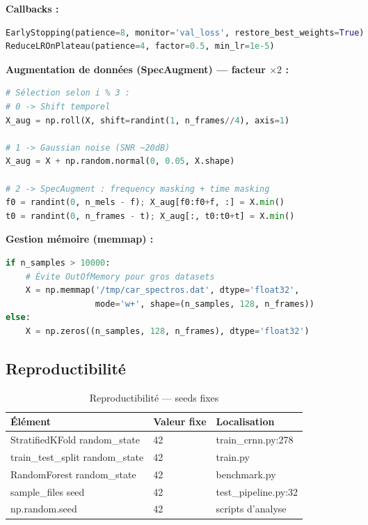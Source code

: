 \documentclass[11pt,a4paper]{article}
\begin{document}
\textbf{Callbacks :}
\begin{lstlisting}[language=Python]
EarlyStopping(patience=8, monitor='val_loss', restore_best_weights=True)
ReduceLROnPlateau(patience=4, factor=0.5, min_lr=1e-5)
\end{lstlisting}

\textbf{Augmentation de données (SpecAugment) — facteur $\times 2$ :}
\begin{lstlisting}[language=Python]
# Sélection selon i % 3 :
# 0 -> Shift temporel
X_aug = np.roll(X, shift=randint(1, n_frames//4), axis=1)

# 1 -> Gaussian noise (SNR ~20dB)
X_aug = X + np.random.normal(0, 0.05, X.shape)

# 2 -> SpecAugment : frequency masking + time masking
f0 = randint(0, n_mels - f); X_aug[f0:f0+f, :] = X.min()
t0 = randint(0, n_frames - t); X_aug[:, t0:t0+t] = X.min()
\end{lstlisting}

\textbf{Gestion mémoire (memmap) :}
\begin{lstlisting}[language=Python]
if n_samples > 10000:
    # Évite OutOfMemory pour gros datasets
    X = np.memmap('/tmp/car_spectros.dat', dtype='float32',
                  mode='w+', shape=(n_samples, 128, n_frames))
else:
    X = np.zeros((n_samples, 128, n_frames), dtype='float32')
\end{lstlisting}

\subsection{Reproductibilité}

\begin{table}[htbp]
\centering
\begin{tabular}{@{}lll@{}}
\toprule
\textbf{Élément} & \textbf{Valeur fixe} & \textbf{Localisation} \\
\midrule
StratifiedKFold random\_state & 42 & train\_crnn.py:278 \\
train\_test\_split random\_state & 42 & train.py \\
RandomForest random\_state & 42 & benchmark.py \\
sample\_files seed & 42 & test\_pipeline.py:32 \\
np.random.seed & 42 & scripts d'analyse \\
\bottomrule
\end{tabular}
\caption{Reproductibilité — seeds fixes}
\end{table}
\end{document}
